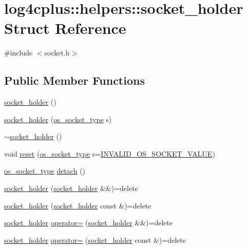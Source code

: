 \hypertarget{structlog4cplus_1_1helpers_1_1socket__holder}{\section{log4cplus\-:\-:helpers\-:\-:socket\-\_\-holder Struct Reference}
\label{structlog4cplus_1_1helpers_1_1socket__holder}
}


{\ttfamily \#include $<$socket.\-h$>$}

\subsection*{Public Member Functions}
\begin{DoxyCompactItemize}
\item 
\hyperlink{structlog4cplus_1_1helpers_1_1socket__holder_ab9e53dfdba0163b3ab94188f24f7dc68}{socket\-\_\-holder} ()
\item 
\hyperlink{structlog4cplus_1_1helpers_1_1socket__holder_a93bf7acf3853f08368b5c9161e1c0246}{socket\-\_\-holder} (\hyperlink{namespacelog4cplus_1_1helpers_a74064c46dd7651c68c1f58b73a1b14ca}{os\-\_\-socket\-\_\-type} s)
\item 
\hyperlink{structlog4cplus_1_1helpers_1_1socket__holder_a6b6bb31a785505d25d368b508a823000}{$\sim$socket\-\_\-holder} ()
\item 
void \hyperlink{structlog4cplus_1_1helpers_1_1socket__holder_a272aec6fca5996c11d14e286fb97b7d5}{reset} (\hyperlink{namespacelog4cplus_1_1helpers_a74064c46dd7651c68c1f58b73a1b14ca}{os\-\_\-socket\-\_\-type} s=\hyperlink{namespacelog4cplus_1_1helpers_a0309d5f8b59dbb947659f53a50595de9}{I\-N\-V\-A\-L\-I\-D\-\_\-\-O\-S\-\_\-\-S\-O\-C\-K\-E\-T\-\_\-\-V\-A\-L\-U\-E})
\item 
\hyperlink{namespacelog4cplus_1_1helpers_a74064c46dd7651c68c1f58b73a1b14ca}{os\-\_\-socket\-\_\-type} \hyperlink{structlog4cplus_1_1helpers_1_1socket__holder_a95b77969b9ccc8b9ab1ba6483004eee0}{detach} ()
\item 
\hyperlink{structlog4cplus_1_1helpers_1_1socket__holder_a4a9bcac12f86f969bdf88867ced7a8aa}{socket\-\_\-holder} (\hyperlink{structlog4cplus_1_1helpers_1_1socket__holder}{socket\-\_\-holder} \&\&)=delete
\item 
\hyperlink{structlog4cplus_1_1helpers_1_1socket__holder_a26c1ca4a090a6b44317fb11520ccddda}{socket\-\_\-holder} (\hyperlink{structlog4cplus_1_1helpers_1_1socket__holder}{socket\-\_\-holder} const \&)=delete
\item 
\hyperlink{structlog4cplus_1_1helpers_1_1socket__holder}{socket\-\_\-holder} \hyperlink{structlog4cplus_1_1helpers_1_1socket__holder_ae43a882ec90dbd69ea97b85e536b1b9c}{operator=} (\hyperlink{structlog4cplus_1_1helpers_1_1socket__holder}{socket\-\_\-holder} \&\&)=delete
\item 
\hyperlink{structlog4cplus_1_1helpers_1_1socket__holder}{socket\-\_\-holder} \hyperlink{structlog4cplus_1_1helpers_1_1socket__holder_a22de336cd774655e5a8168de36430e57}{operator=} (\hyperlink{structlog4cplus_1_1helpers_1_1socket__holder}{socket\-\_\-holder} const \&)=delete
\end{DoxyCompactItemize}
